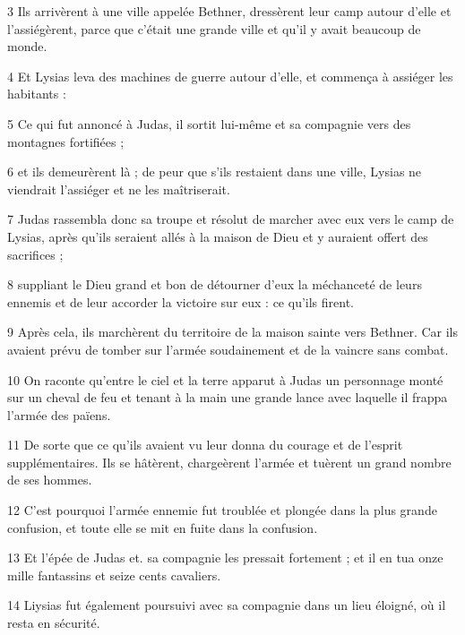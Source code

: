 \par 3 Ils arrivèrent à une ville appelée Bethner, dressèrent leur camp autour d'elle et l'assiégèrent, parce que c'était une grande ville et qu'il y avait beaucoup de monde.

\par 4 Et Lysias leva des machines de guerre autour d'elle, et commença à assiéger les habitants :

\par 5 Ce qui fut annoncé à Judas, il sortit lui-même et sa compagnie vers des montagnes fortifiées ;

\par 6 et ils demeurèrent là ; de peur que s'ils restaient dans une ville, Lysias ne viendrait l'assiéger et ne les maîtriserait.

\par 7 Judas rassembla donc sa troupe et résolut de marcher avec eux vers le camp de Lysias, après qu'ils seraient allés à la maison de Dieu et y auraient offert des sacrifices ;

\par 8 suppliant le Dieu grand et bon de détourner d'eux la méchanceté de leurs ennemis et de leur accorder la victoire sur eux : ce qu'ils firent.

\par 9 Après cela, ils marchèrent du territoire de la maison sainte vers Bethner. Car ils avaient prévu de tomber sur l’armée soudainement et de la vaincre sans combat.

\par 10 On raconte qu'entre le ciel et la terre apparut à Judas un personnage monté sur un cheval de feu et tenant à la main une grande lance avec laquelle il frappa l'armée des païens.

\par 11 De sorte que ce qu'ils avaient vu leur donna du courage et de l'esprit supplémentaires. Ils se hâtèrent, chargeèrent l'armée et tuèrent un grand nombre de ses hommes.

\par 12 C'est pourquoi l'armée ennemie fut troublée et plongée dans la plus grande confusion, et toute elle se mit en fuite dans la confusion.

\par 13 Et l'épée de Judas et. sa compagnie les pressait fortement ; et il en tua onze mille fantassins et seize cents cavaliers.

\par 14 Liysias fut également poursuivi avec sa compagnie dans un lieu éloigné, où il resta en sécurité.

